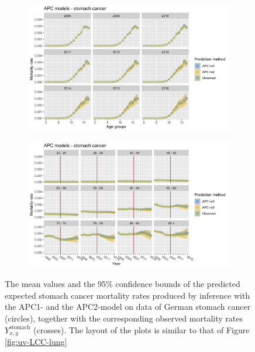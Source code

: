 \begin{figure}[h!]
    \centering
    \begin{subfigure}[b]{.75\linewidth}
        \includegraphics[width=\linewidth]{real-data/real-data-univariate/Figures/univariate-APC-by-age-stomach.png}
    \end{subfigure}
    
    \begin{subfigure}[b]{.75\linewidth}
        \includegraphics[width=\linewidth]{real-data/real-data-univariate/Figures/univariate-APC-by-period-stomach.png}
    \end{subfigure}
    \caption{The mean values and the 95\% confidence bounds of the predicted expected stomach cancer mortality rates produced by inference with the APC1- and the APC2-model on data of German stomach cancer (circles), together with the corresponding observed mortality rates $Y_{x,y}^{\text{stomach}}$ (crosses). The layout of the plots is similar to that of Figure \ref{fig:uv-LCC-lung}}
    \label{fig:uv-APC-stomach}
\end{figure}

